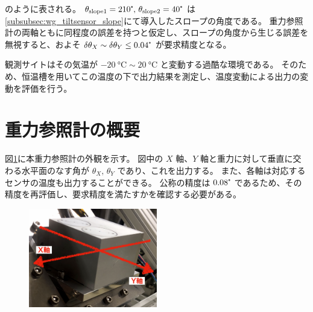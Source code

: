 \documentclass[../../main.tex]{subfiles}
\begin{document}
のように表される。
$\theta_{\mathrm{slope}1}=210\tcdegree,\,\theta_{\mathrm{slope}2}=40\tcdegree$ は\ref{subsubsec:wg_tiltsensor_slope}にて導入したスロープの角度である。
重力参照計の両軸ともに同程度の誤差を持つと仮定し、スロープの角度から生じる誤差を無視すると、およそ $\delta\theta_{X} \sim \delta\theta_{Y} \leq 0.04\tcdegree$ が要求精度となる。

観測サイトはその気温が $\SI{-20}{\degreeCelsius} \sim \SI{20}{\degreeCelsius}$ と変動する過酷な環境である。
そのため、恒温槽を用いてこの温度の下で出力結果を測定し、温度変動による出力の変動を評価を行う。

\section{重力参照計の概要}
図\ref{fig:tiltsensor_DSIC-2051-60}に本重力参照計の外観を示す。
図中の $X$ 軸、$Y$ 軸と重力に対して垂直に交わる水平面のなす角が $\theta_{X},\,\theta_{Y}$ であり、これを出力する。
また、各軸は対応するセンサの温度も出力することができる。
公称の精度は $0.08\tcdegree$ であるため、その精度を再評価し、要求精度を満たすかを確認する必要がある。
\begin{figure}[H]
    \centering
    \includegraphics[width=0.5\textwidth]{tiltsensor/tiltsensor_overview.pdf}
    \label{fig:tiltsensor_DSIC-2051-60}
\end{figure}

\end{document}
